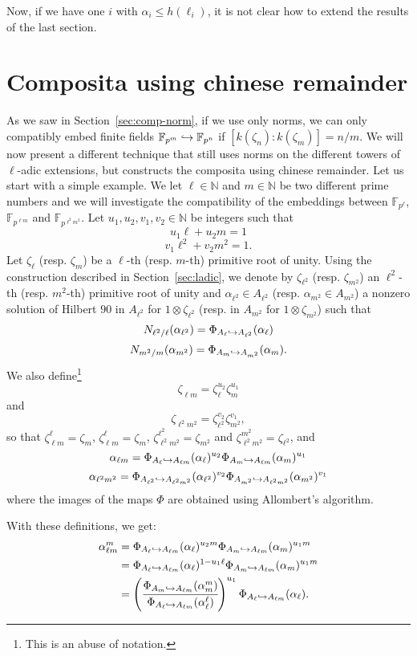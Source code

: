 \documentclass[a4paper,11pt]{article}
\begin{document}
Now, if we have one $i$ with $\alpha_i\leq h(\ell_i)$, it is not clear how to
extend the results of the last section.

\section{Composita using chinese remainder}
\label{sec:comp-crt}

As we saw in Section~\ref{sec:comp-norm}, if we use only norms, we can only
compatibly embed finite fields $\mathbb{F}_{p^m}\hookrightarrow\mathbb{F}_{p^n}$ if
$[k(\zeta_n):k(\zeta_m)]=n/m$. We will now present a different technique that
still uses norms on the different towers of $\ell$-adic extensions, but
constructs the composita using chinese remainder. Let us start with a simple
example. We let $\ell\in\mathbb{N}$ and $m\in\mathbb{N}$ be two different prime numbers and we will
investigate the compatibility of the embeddings between $\mathbb{F}_{p^\ell}$,
$\mathbb{F}_{p^{\ell m}}$ and $\mathbb{F}_{p^{\ell^2 m^2}}$. Let $u_1, u_2, v_1,
v_2\in \mathbb{N}$ be integers such that
\[
  u_1\ell+u_2m=1
\]
\[
  v_1\ell^2+v_2m^2=1.
\]
Let $\zeta_\ell$ (resp. $\zeta_m$) be a $\ell$-th (resp. $m$-th) primitive root
of unity. Using the construction described in Section~\ref{sec:ladic}, we denote
by $\zeta_{\ell^2}$ (resp. $\zeta_{m^2}$) an $\ell^2$-th (resp. $m^2$-th)
primitive root of unity and $\alpha_{\ell^2}\in A_{\ell^2}$ (resp.
$\alpha_{m^2}\in A_{m^2}$) a nonzero solution of Hilbert $90$ in $A_{\ell^2}$
for $1\otimes\zeta_{\ell^2}$ (resp. in $A_{m^2}$ for $1\otimes\zeta_{m^2}$) such that
\[
  N_{\ell^2/\ell}(\alpha_{\ell^2})=\Phi_{A_\ell\hookrightarrow A_{\ell^2}}(\alpha_\ell)
\]
\[
  N_{m^2/m}(\alpha_{m^2})=\Phi_{A_m\hookrightarrow A_{m^2}}(\alpha_m).
\]
We also define\footnote{This is an abuse of notation.}
\[
  \zeta_{\ell m}=\zeta_\ell^{u_2}\zeta_{m}^{u_1}
\]
and
\[
  \zeta_{\ell^2 m^2}=\zeta_{\ell^2}^{v_2}\zeta_{m^2}^{v_1},
\]
so that $\zeta_{\ell m}^\ell = \zeta_m$, $\zeta_{\ell m}^\ell=\zeta_m$,
$\zeta_{\ell^2m^2}^{\ell^2}=\zeta_{m^2}$ and $\zeta_{\ell^2
m^2}^{m^2}=\zeta_{\ell^2}$, and
\[
  \alpha_{\ell m}=\Phi_{A_\ell\hookrightarrow A_{\ell m}}(\alpha_\ell)^{u_2}\Phi_{A_m\hookrightarrow
    A_{\ell m}}(\alpha_m)^{u_1}
\]
\[
  \alpha_{\ell^2 m^2}=\Phi_{A_{\ell^2}\hookrightarrow A_{\ell^2
  m^2}}(\alpha_{\ell^2})^{v_2}\Phi_{A_{m^2}\hookrightarrow
  A_{\ell^2 m^2}}(\alpha_{m^2})^{v_1}
\]
where the images of the maps $\Phi$ are obtained using Allombert's algorithm.

With these definitions, we get:
\begin{align*}
  \alpha_{\ell m}^m &= \Phi_{A_\ell\hookrightarrow A_{\ell m}}(\alpha_\ell)^{u_2m}\Phi_{A_m\hookrightarrow
    A_{\ell m}}(\alpha_m)^{u_1m} \\
  &= \Phi_{A_\ell\hookrightarrow A_{\ell m}}(\alpha_\ell)^{1-u_1\ell}\Phi_{A_m\hookrightarrow
    A_{\ell m}}(\alpha_m)^{u_1m} \\
    &= \left( \cfrac{\Phi_{A_m\hookrightarrow A_{\ell m}}(\alpha_{m}^m)}{\Phi_{A_\ell\hookrightarrow A_{\ell
    m}}(\alpha_\ell^\ell)}\right)^{u_1} \Phi_{A_\ell\hookrightarrow A_{\ell
    m}}(\alpha_\ell).
\end{align*}
\end{document}
